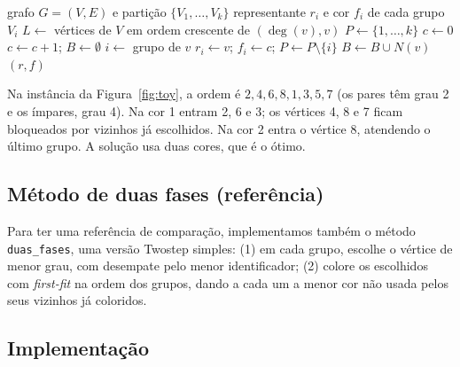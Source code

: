 \documentclass[12pt]{article}
\begin{document}
\begin{algorithm}[ht]
  \caption{Guloso por classes de cor}\label{alg:guloso}
  \begin{algorithmic}[1]
    \Require grafo $G=(V,E)$ e partição $\{V_1,\dots,V_k\}$
    \Ensure representante $r_i$ e cor $f_i$ de cada grupo $V_i$
    \State $L \gets$ vértices de $V$ em ordem crescente de $(\deg(v), v)$
    \State $P \gets \{1,\dots,k\}$ 
    \State $c \gets 0$
      \State $c \gets c+1$; \quad $B \gets \emptyset$ 
        \State $i \gets$ grupo de $v$
          \State $r_i \gets v$; \quad $f_i \gets c$; \quad $P \gets P\setminus\{i\}$
          \State $B \gets B \cup N(v)$
        \EndIf
      \EndFor
    \EndWhile
    \State \Return $(r, f)$
  \end{algorithmic}
\end{algorithm}

Na instância da Figura~\ref{fig:toy}, a ordem é $2,4,6,8,1,3,5,7$ (os pares
têm grau 2 e os ímpares, grau 4). Na cor 1 entram 2, 6 e 3; os vértices 4, 8 e
7 ficam bloqueados por vizinhos já escolhidos. Na cor 2 entra o vértice 8,
atendendo o último grupo. A solução usa duas cores, que é o ótimo.

\subsection{Método de duas fases (referência)}

Para ter uma referência de comparação, implementamos também o método
\texttt{duas\_fases}, uma versão Twostep simples: (1) em cada grupo, escolhe o
vértice de menor grau, com desempate pelo menor identificador; (2) colore os
escolhidos com \emph{first-fit} na ordem dos grupos, dando a cada um a menor cor
não usada pelos seus vizinhos já coloridos.

\subsection{Implementação}
\end{document}
